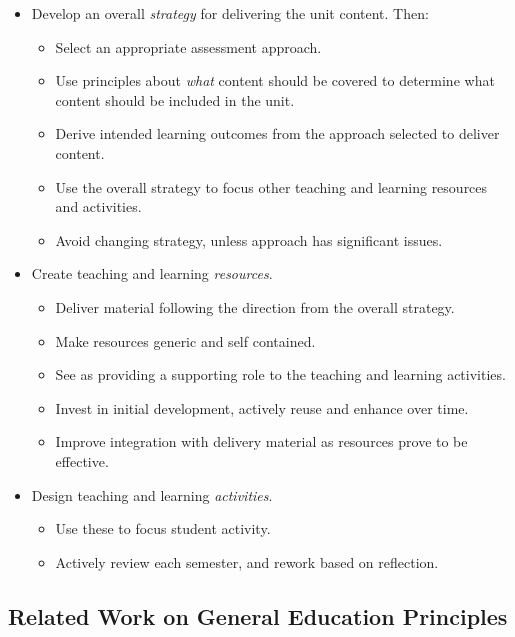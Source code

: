 \begin{itemize}[noitemsep,nolistsep]
	\item Develop an overall \emph{strategy} for delivering the unit content. Then:
	\begin{itemize}[noitemsep,nolistsep]
		\item Select an appropriate assessment approach.
		\item Use principles about \emph{what} content should be covered to determine what content should be included in the unit.
		\item Derive intended learning outcomes from the approach selected to deliver content.
		\item Use the overall strategy to focus other teaching and learning resources and activities.
		\item Avoid changing strategy, unless approach has significant issues.
	\end{itemize}

	\item Create teaching and learning \emph{resources}.
	\begin{itemize}[noitemsep,nolistsep]
		\item Deliver material following the direction from the overall strategy.
		\item Make resources generic and self contained.
		\item See as providing a supporting role to the teaching and learning activities.
		\item Invest in initial development, actively reuse and enhance over time.
		\item Improve integration with delivery material as resources prove to be effective.
	\end{itemize}

	\item Design teaching and learning \emph{activities}.
	\begin{itemize}[noitemsep,nolistsep]
		\item Use these to focus student activity.
		\item Actively review each semester, and rework based on reflection.
	\end{itemize}
\end{itemize} 



\subsection{Related Work on General Education Principles} %
\label{ssub:related_work_on_education_principles}

